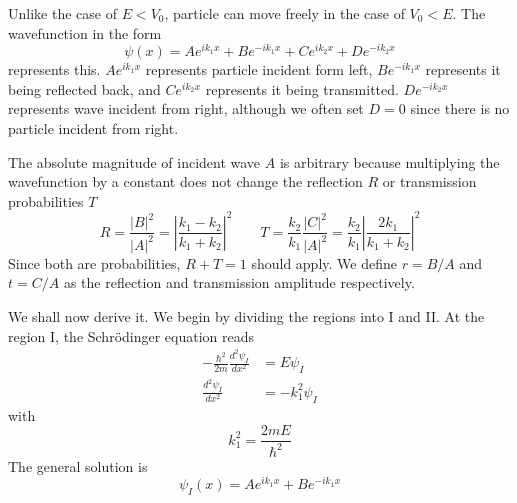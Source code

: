 \documentclass[../../../main.tex]{subfiles}
\begin{document}
Unlike the case of $E<V_0$, particle can move freely in the case of $V_0<E$.
The wavefunction in the form
\begin{equation*}
  \psi(x)=Ae^{ik_1x}+Be^{-ik_1x}+Ce^{ik_2 x}+De^{-ik_2x}
\end{equation*}
represents this.
$Ae^{ik_1x}$ represents particle incident form left, $Be^{-ik_1x}$ represents it being reflected back, and $Ce^{ik_2 x}$ represents it being transmitted.
$De^{-ik_2x}$ represents wave incident from right, although we often set $D=0$ since there is no particle incident from right.

The absolute magnitude of incident wave $A$ is arbitrary because multiplying the wavefunction by a constant does not change the reflection $R$ or transmission probabilities $T$
\begin{equation*}
  R=\frac{|B|^2}{|A|^2}=\left|\frac{k_1-k_2 }{k_1+k_2}\right|^2
  \qquad
  T = \frac{k_2}{k_1} \frac{|C|^2}{|A|^2} = \frac{k_2}{k_1} \left| \frac{2 k_1}{k_1 + k_2} \right|^2
\end{equation*}
Since both are probabilities, $R+T=1$ should apply.
We define $r=B/A$ and $t=C/A$ as the reflection and transmission amplitude respectively.

We shall now derive it.
We begin by dividing the regions into I and II.
At the region I, the Schrödinger equation reads
\begin{align*}
  -\frac{\hbar^2}{2m} \frac{d^2 \psi_{I}}{dx^2} & =  E \psi_I        \\
  \frac{d^2 \psi_{I}}{dx^2}                     & = - k_1^2 \psi_{I}
\end{align*}
with
\begin{equation*}
  k_1^2 =\frac{2 m E}{\hbar^2}
\end{equation*}
The general solution is
\begin{equation*}
  \psi_I(x) = A e^{i k_1 x} + B e^{-i k_1 x}
\end{equation*}
\end{document}
